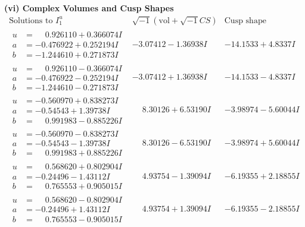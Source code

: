 \documentclass[1p]{elsarticle_modified}
\theoremstyle{definition}
\newcommand{\I}{\sqrt{-1}}
\begin{document}
\newpage\flushleft \textbf{(vi) Complex Volumes and Cusp Shapes}
$$\begin{array}{c|c|c}  
\text{Solutions to }I^u_{1}& \I (\text{vol} + \sqrt{-1}CS) & \text{Cusp shape}\\
 \hline 
\begin{aligned}
u &= \phantom{-}0.926110 + 0.366074 I \\
a &= -0.476922 + 0.252194 I \\
b &= -1.244610 + 0.271873 I\end{aligned}
 & -3.07412 - 1.36938 I & -14.1533 + 4.8337 I \\ \hline\begin{aligned}
u &= \phantom{-}0.926110 - 0.366074 I \\
a &= -0.476922 - 0.252194 I \\
b &= -1.244610 - 0.271873 I\end{aligned}
 & -3.07412 + 1.36938 I & -14.1533 - 4.8337 I \\ \hline\begin{aligned}
u &= -0.560970 + 0.838273 I \\
a &= -0.54543 + 1.39738 I \\
b &= \phantom{-}0.991983 - 0.885226 I\end{aligned}
 & \phantom{-}8.30126 + 6.53190 I & -3.98974 - 5.60044 I \\ \hline\begin{aligned}
u &= -0.560970 - 0.838273 I \\
a &= -0.54543 - 1.39738 I \\
b &= \phantom{-}0.991983 + 0.885226 I\end{aligned}
 & \phantom{-}8.30126 - 6.53190 I & -3.98974 + 5.60044 I \\ \hline\begin{aligned}
u &= \phantom{-}0.568620 + 0.802904 I \\
a &= -0.24496 - 1.43112 I \\
b &= \phantom{-}0.765553 + 0.905015 I\end{aligned}
 & \phantom{-}4.93754 - 1.39094 I & -6.19355 + 2.18855 I \\ \hline\begin{aligned}
u &= \phantom{-}0.568620 - 0.802904 I \\
a &= -0.24496 + 1.43112 I \\
b &= \phantom{-}0.765553 - 0.905015 I\end{aligned}
 & \phantom{-}4.93754 + 1.39094 I & -6.19355 - 2.18855 I \\ \hline\begin{aligned}

\end{aligned}
\end{array}$$
\end{document}
